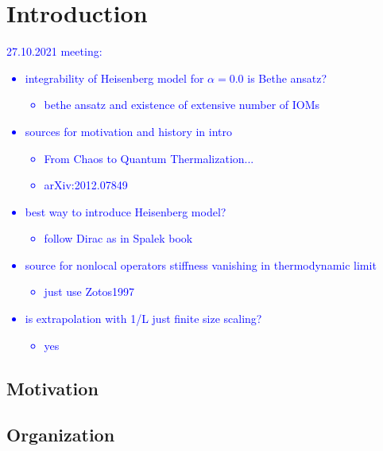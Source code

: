 \chapter{Introduction}
\thispagestyle{chapterBeginStyle}

\textcolor{blue}{
    27.10.2021 meeting:
    \begin{itemize}
        \item integrability of Heisenberg model for \(\alpha = 0.0 \) is Bethe ansatz?
        {
            \begin{itemize}
                \item bethe ansatz and existence of extensive number of IOMs
            \end{itemize}
        }
        \item sources for motivation and history in intro
        {
            \begin{itemize}
                \item From Chaos to Quantum Thermalization...
                \item arXiv:2012.07849
            \end{itemize}
        }
        \item best way to introduce Heisenberg model?
        {\begin{itemize}
            \item follow Dirac as in Spalek book
        \end{itemize}}
        \item source for nonlocal operators stiffness vanishing in thermodynamic limit
        {\begin{itemize}
            \item just use Zotos1997
        \end{itemize}}
        \item is extrapolation with 1/L just finite size scaling?
        {\begin{itemize}
            \item yes
        \end{itemize}}
    \end{itemize}
}


\section{Motivation}

\section{Organization}
